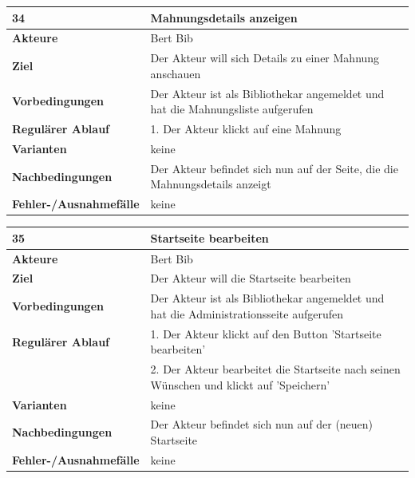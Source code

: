 \documentclass[fontsize=12pt,paper=a4,twoside]{scrartcl}
\begin{document}
\begin{table}[htbp]
\label{34}
\begin{tabular}{|l|p{10cm}|}
\hline 
\textbf{34} & \textbf{Mahnungsdetails anzeigen} \\ \hline
\textbf{Akteure} & Bert Bib\\ \hline
\textbf{Ziel} & Der Akteur will sich Details zu einer Mahnung anschauen \\ \hline
\textbf{Vorbedingungen} & Der Akteur ist als Bibliothekar angemeldet und hat die Mahnungsliste aufgerufen \\ \hline
\textbf{Regulärer Ablauf} & 
1. Der Akteur klickt auf eine Mahnung \\
\hline
\textbf{Varianten} & 
keine \\ \hline
\textbf{Nachbedingungen} & Der Akteur befindet sich nun auf der Seite, die die Mahnungsdetails anzeigt\\ \hline
\textbf{Fehler-/Ausnahmefälle} & keine\\
\hline
\end{tabular}
\end{table}

\begin{table}[htbp]
\label{35}
\begin{tabular}{|l|p{10cm}|}
\hline 
\textbf{35} & \textbf{Startseite bearbeiten} \\ \hline
\textbf{Akteure} & Bert Bib\\ \hline
\textbf{Ziel} & Der Akteur will die Startseite bearbeiten \\ \hline
\textbf{Vorbedingungen} & Der Akteur ist als Bibliothekar angemeldet und hat die Administrationsseite aufgerufen \\ \hline
\textbf{Regulärer Ablauf} & 
1. Der Akteur klickt auf den Button 'Startseite bearbeiten' \\
&2. Der Akteur bearbeitet die Startseite nach seinen Wünschen und klickt auf 'Speichern'\\
\hline
\textbf{Varianten} & 
keine \\ \hline
\textbf{Nachbedingungen} & Der Akteur befindet sich nun auf der (neuen) Startseite \\ \hline
\textbf{Fehler-/Ausnahmefälle} & keine\\
\hline
\end{tabular}
\end{table}
\end{document}
